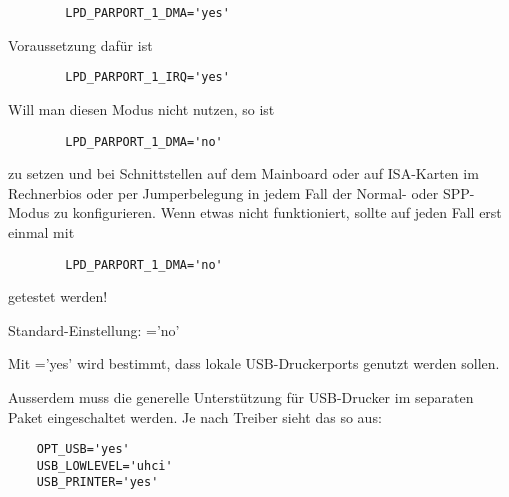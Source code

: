 \begin{description}
{\begin{example}
\begin{verbatim}
        LPD_PARPORT_1_DMA='yes'
\end{verbatim}
\end{example}

        Voraussetzung dafür ist

\begin{example}
\begin{verbatim}
        LPD_PARPORT_1_IRQ='yes'
\end{verbatim}
\end{example}

        Will man diesen Modus nicht nutzen, so ist

\begin{example}
\begin{verbatim}
        LPD_PARPORT_1_DMA='no'
\end{verbatim}
\end{example}

        zu setzen und bei Schnittstellen auf dem Mainboard oder auf ISA-Karten
        im Rechnerbios oder per Jumperbelegung in jedem Fall der Normal- oder
        SPP-Modus zu konfigurieren.
        Wenn etwas nicht funktioniert, sollte auf jeden Fall erst einmal mit

\begin{example}
\begin{verbatim}
        LPD_PARPORT_1_DMA='no'
\end{verbatim}
\end{example}

        getestet werden!

        Standard-Einstellung: ='no'}



    Mit ='yes' wird bestimmt, dass lokale
    USB-Druckerports genutzt werden sollen.

    Ausserdem muss die generelle Unterstützung für USB-Drucker im separaten
    Paket  eingeschaltet werden. Je nach Treiber sieht das
    so aus:

\begin{example}
\begin{verbatim}
    OPT_USB='yes'
    USB_LOWLEVEL='uhci'
    USB_PRINTER='yes'
\end{verbatim}
\end{example}


\end{description}
